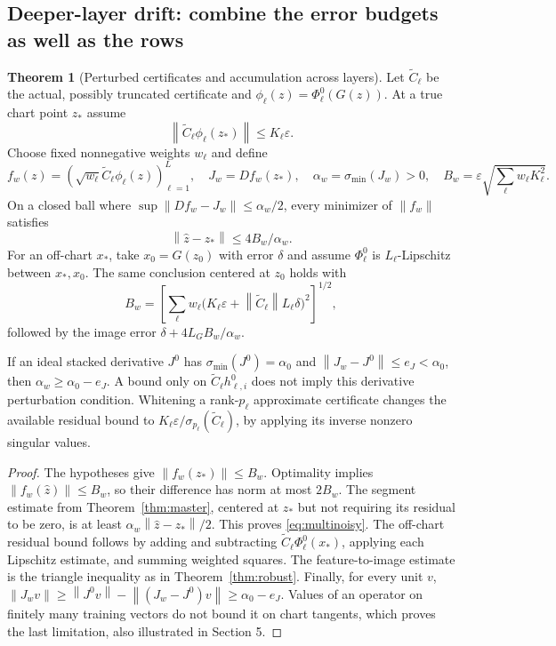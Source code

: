 \documentclass[11pt,a4paper]{article}
\theoremstyle{definition}
\newtheorem{theorem}{Theorem}[section]
\theoremstyle{definition}
\theoremstyle{remark}\newtheorem{remark}[theorem]{Remark}
\newcommand{\smin}{\sigma_{\min}}\newcommand{\smax}{\sigma_{\max}}
\newcommand{\norm}[1]{\left\lVert #1\right\rVert}
\begin{document}
\subsection{Deeper-layer drift: combine the error budgets as well as the rows}

\begin{theorem}[Perturbed certificates and accumulation across layers]\label{thm:layernoise}
Let $\widetilde C_\ell$ be the actual, possibly truncated certificate and $\phi_\ell(z)=\Phi_\ell^0(G(z))$. At a true chart point $z_*$ assume
\[
\norm{\widetilde C_\ell\phi_\ell(z_*)}\le K_\ell\varepsilon.
\]
Choose fixed nonnegative weights $w_\ell$ and define
\[
f_w(z)=(\sqrt{w_\ell}\widetilde C_\ell\phi_\ell(z))_{\ell=1}^L,
\quad J_w=Df_w(z_*),\quad\alpha_w=\smin(J_w)>0,
\quad B_w=\varepsilon\sqrt{\sum_\ell w_\ell K_\ell^2}.
\]
On a closed ball where $\sup\norm{Df_w-J_w}\le\alpha_w/2$, every minimizer of $\norm{f_w}$ satisfies
\begin{equation}\label{eq:multinoisy}
\norm{\widehat z-z_*}\le4B_w/\alpha_w.
\end{equation}
For an off-chart $x_*$, take $x_0=G(z_0)$ with error $\delta$ and assume $\Phi_\ell^0$ is $L_\ell$-Lipschitz between $x_*,x_0$. The same conclusion centered at $z_0$ holds with
\[
B_w=\left[\sum_\ell w_\ell
\big(K_\ell\varepsilon+\norm{\widetilde C_\ell}L_\ell\delta\big)^2\right]^{1/2},
\]
followed by the image error $\delta+4L_GB_w/\alpha_w$.

If an ideal stacked derivative $J^0$ has $\smin(J^0)=\alpha_0$ and $\norm{J_w-J^0}\le e_J<\alpha_0$, then $\alpha_w\ge\alpha_0-e_J$. A bound only on $\widetilde C_\ell h_{\ell,i}^0$ does not imply this derivative perturbation condition. Whitening a rank-$p_\ell$ approximate certificate changes the available residual bound to $K_\ell\varepsilon/\sigma_{p_\ell}(\widetilde C_\ell)$, by applying its inverse nonzero singular values.
\end{theorem}
\begin{proof}
The hypotheses give $\norm{f_w(z_*)}\le B_w$. Optimality implies $\norm{f_w(\widehat z)}\le B_w$, so their difference has norm at most $2B_w$. The segment estimate from Theorem~\ref{thm:master}, centered at $z_*$ but not requiring its residual to be zero, is at least $\alpha_w\norm{\widehat z-z_*}/2$. This proves \eqref{eq:multinoisy}. The off-chart residual bound follows by adding and subtracting $\widetilde C_\ell\Phi_\ell^0(x_*)$, applying each Lipschitz estimate, and summing weighted squares. The feature-to-image estimate is the triangle inequality as in Theorem~\ref{thm:robust}. Finally, for every unit $v$, $\norm{J_wv}\ge\norm{J^0v}-\norm{(J_w-J^0)v}\ge\alpha_0-e_J$. Values of an operator on finitely many training vectors do not bound it on chart tangents, which proves the last limitation, also illustrated in Section 5.
\end{proof}
\end{document}
